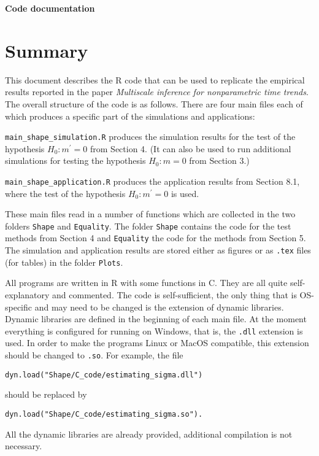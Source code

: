 \documentclass[a4paper,12pt]{article}
\begin{document}
\begin{center}
{\LARGE \bf Code documentation}
\end{center}
\vspace{0.5cm}



\section*{Summary}


\setlength{\parskip}{0.2cm} 
This document describes the R code that can be used to replicate the empirical results reported in the paper \textit{Multiscale inference for nonparametric time trends}. The overall structure of the code is as follows. There are four main files each of which produces a specific part of the simulations and applications:
\vspace{0.2cm}

\everypar{\hangafter=1\hangindent=1.45cm\relax}
\verb|main_shape_simulation.R| \hspace{1pt} produces the simulation results for the test of the hypothesis $H_0: m^\prime = 0$ from Section 4. (It can also be used to run additional simulations for testing the hypothesis $H_0: m = 0$ from Section $3$.)

\verb|main_shape_application.R| \hspace{1pt} produces the application results from Section 8.1, where the test of the hypothesis $H_0: m^\prime = 0$ is used.


\everypar{\hangafter=0\relax}
These main files read in a number of functions which are collected in the two folders \verb|Shape| and \verb|Equality|. The folder \verb|Shape| contains the code for the test methods from Section 4 and \verb|Equality| the code for the methods from Section 5. The simulation and application results are stored either as figures or as \verb|.tex| files (for tables) in the folder \verb|Plots|. 
\vspace{0.2cm}


All programs are written in R with some functions in C. They are all quite self-explanatory and commented. The code is self-sufficient, the only thing that is OS-specific and may need to be changed is the extension of dynamic libraries. Dynamic libraries are defined in the beginning of each main file. At the moment everything is configured for running on Windows, that is, the \verb|.dll| extension is used. In order to make the programs Linux or MacOS compatible, this extension should be changed to \verb|.so|. For example, the file
\begin{verbatim}
dyn.load("Shape/C_code/estimating_sigma.dll")
\end{verbatim} should be replaced by
\begin{verbatim}
dyn.load("Shape/C_code/estimating_sigma.so").
\end{verbatim}
All the dynamic libraries are already provided, additional  compilation is not necessary.
\end{document}
